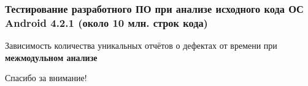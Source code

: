 \documentclass[hyperref={pdfpagelabels=false},10pt]{beamer}
\begin{document}
\begin{frame}
\frametitle{Тестирование разработного ПО при анализе исходного кода ОС Android 4.2.1 (около 10 млн. строк кода)}
Зависимость количества уникальных отчётов о дефектах от времени  при \textbf{межмодульном анализе}

\begin{figure}[h]
\end{figure}
\end{frame}

\begin{frame}
\begin{center}
Спасибо за внимание!
\end{center}
\end{frame}
\end{document}
